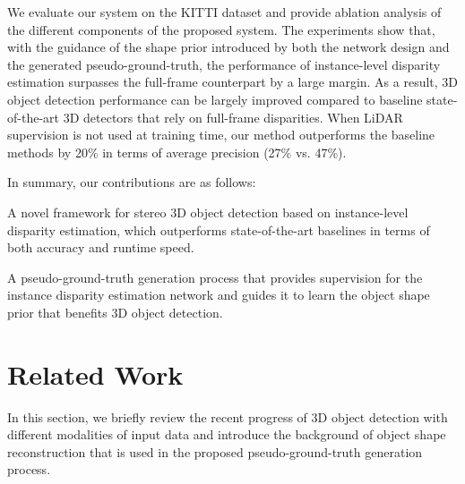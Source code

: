 \documentclass[10pt,twocolumn,letterpaper]{article}
\begin{document}
We evaluate our system on the KITTI dataset and provide ablation analysis of the different components of the proposed system.
The experiments show that, with the guidance of the shape prior introduced by both the network design and the generated pseudo-ground-truth, the performance of instance-level disparity estimation surpasses the full-frame counterpart by a large margin.
As a result, 3D object detection performance can be largely improved compared to baseline state-of-the-art 3D detectors that rely on full-frame disparities.
When LiDAR supervision is not used at training time, our method outperforms the baseline methods by 20\% in terms of average precision (27\% vs. 47\%).

In summary, our contributions are as follows:
\begin{compactitem}
 \item A novel framework for stereo 3D object detection based on instance-level disparity estimation, which outperforms state-of-the-art baselines in terms of both accuracy and runtime speed.
 \item A pseudo-ground-truth generation process that provides supervision for the instance disparity estimation network and guides it to learn the object shape prior that benefits 3D object detection.
 \end{compactitem} \section{Related Work}\label{sec:related-work}
In this section, we briefly review the recent progress of 3D object detection with different modalities of input data and introduce the background of object shape reconstruction that is used in the proposed pseudo-ground-truth generation process.
\end{document}
